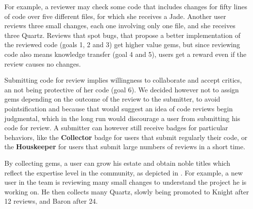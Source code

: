 For example, a reviewer may check some code that includes changes for fifty lines of code over five different files, for which she receives a Jade.
Another user reviews three small changes, each one involving only one file, and she receives three Quartz.
Reviews that spot bugs, that propose a better implementation of the reviewed code (goals 1, 2 and 3) get higher value gems, but since reviewing code also means knowledge transfer (goal 4 and 5), users get a reward even if the review causes no changes.

Submitting code for review implies willingness to collaborate and accept critics, an not being protective of her code (goal 6).
We decided however not to assign gems depending on the outcome of the review to the submitter, to avoid pointsification and because that would suggest an idea of code reviews begin judgmental, which in the long run would discourage a user from submitting his code for review.
A submitter can however still receive badges for particular behaviors, like the \textbf{Collector} badge for users that submit regularly their code, or the \textbf{Houskeeper} for users that submit large numbers of reviews in a short time.

By collecting gems, a user can grow his estate and obtain noble titles which reflect the expertise level in the community, as depicted in .
For example, a new user in the team is reviewing many small changes to understand the project he is working on.
He then collects many Quartz, slowly being promoted to Knight after 12 reviews, and Baron after 24.

